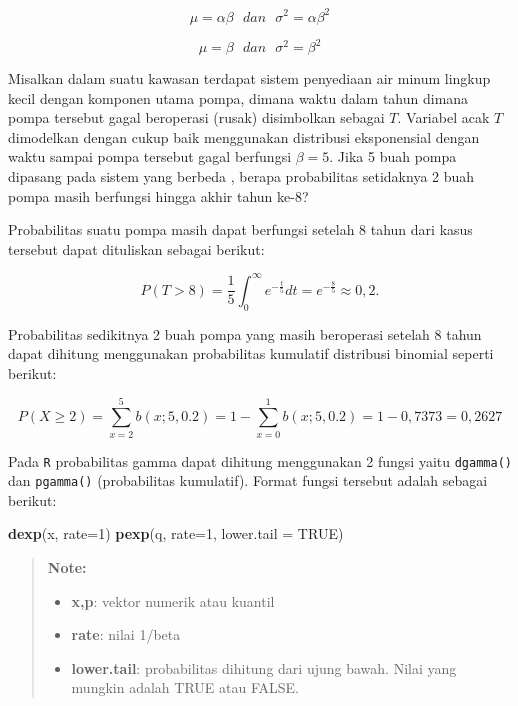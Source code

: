 \documentclass[]{book}
\newenvironment{Shaded}{\begin{snugshade}}{\end{snugshade}}
\newcommand{\KeywordTok}[1]{\textcolor[rgb]{0.13,0.29,0.53}{\textbf{#1}}}
\newcommand{\DataTypeTok}[1]{\textcolor[rgb]{0.13,0.29,0.53}{#1}}
\newcommand{\DecValTok}[1]{\textcolor[rgb]{0.00,0.00,0.81}{#1}}
\newcommand{\OtherTok}[1]{\textcolor[rgb]{0.56,0.35,0.01}{#1}}
\newcommand{\NormalTok}[1]{#1}
\providecommand{\tightlist}{%
  \setlength{\itemsep}{0pt}\setlength{\parskip}{0pt}}
\begin{document}
\begin{equation}
   \mu=\alpha\beta\ \ \ dan\ \ \ \sigma^2=\alpha\beta^2
  \label{eq:dgamma3}
\end{equation}

\begin{equation}
   \mu=\beta\ \ \ dan\ \ \ \sigma^2=\beta^2
  \label{eq:deksponen2}
\end{equation}

Misalkan dalam suatu kawasan terdapat sistem penyediaan air minum
lingkup kecil dengan komponen utama pompa, dimana waktu dalam tahun
dimana pompa tersebut gagal beroperasi (rusak) disimbolkan sebagai
\(T\). Variabel acak \(T\) dimodelkan dengan cukup baik menggunakan
distribusi eksponensial dengan waktu sampai pompa tersebut gagal
berfungsi \(\beta=5\). Jika 5 buah pompa dipasang pada sistem yang
berbeda , berapa probabilitas setidaknya 2 buah pompa masih berfungsi
hingga akhir tahun ke-8?

Probabilitas suatu pompa masih dapat berfungsi setelah 8 tahun dari
kasus tersebut dapat dituliskan sebagai berikut:

\[
P\left(T>8\right)=\frac{1}{5}\int_0^{\infty}e^{-\frac{t}{5}}dt=e^{-\frac{8}{5}}\approx0,2.
\]

Probabilitas sedikitnya 2 buah pompa yang masih beroperasi setelah 8
tahun dapat dihitung menggunakan probabilitas kumulatif distribusi
binomial seperti berikut:

\[
P\left(X\ge2\right)=\sum_{x=2}^5b\left(x;5,0.2\right)=1-\sum_{x=0}^1b\left(x;5,0.2\right)=1-0,7373=0,2627
\]

Pada \texttt{R} probabilitas gamma dapat dihitung menggunakan 2 fungsi
yaitu \texttt{dgamma()} dan \texttt{pgamma()} (probabilitas kumulatif).
Format fungsi tersebut adalah sebagai berikut:

\begin{Shaded}
\begin{Highlighting}[]
\KeywordTok{dexp}\NormalTok{(x, }\DataTypeTok{rate=}\DecValTok{1}\NormalTok{)}
\KeywordTok{pexp}\NormalTok{(q, }\DataTypeTok{rate=}\DecValTok{1}\NormalTok{, }\DataTypeTok{lower.tail =} \OtherTok{TRUE}\NormalTok{)}
\end{Highlighting}
\end{Shaded}

\begin{quote}
\textbf{Note: }

\begin{itemize}
\tightlist
\item
  \textbf{x,p}: vektor numerik atau kuantil
\item
  \textbf{rate}: nilai 1/beta
\item
  \textbf{lower.tail}: probabilitas dihitung dari ujung bawah. Nilai
  yang mungkin adalah TRUE atau FALSE.
\end{itemize}
\end{quote}
\end{document}
